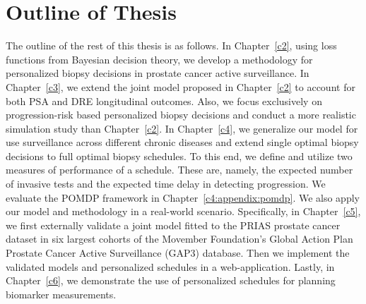 \section{Outline of Thesis}
\label{c1:sec:thesis_outline}
The outline of the rest of this thesis is as follows. In Chapter~\ref{c2}, using loss functions from Bayesian decision theory, we develop a methodology for personalized biopsy decisions in prostate cancer active surveillance. In Chapter~\ref{c3}, we extend the joint model proposed in Chapter~\ref{c2} to account for both PSA and DRE longitudinal outcomes. Also, we focus exclusively on progression-risk based personalized biopsy decisions and conduct a more realistic simulation study than Chapter~\ref{c2}. In Chapter~\ref{c4}, we generalize our model for use surveillance across different chronic diseases and extend single optimal biopsy decisions to full optimal biopsy schedules. To this end, we define and utilize two measures of performance of a schedule. These are, namely, the expected number of invasive tests and the expected time delay in detecting progression. We evaluate the POMDP framework in Chapter~\ref{c4:appendix:pomdp}. We also apply our model and methodology in a real-world scenario. Specifically, in Chapter~\ref{c5}, we first externally validate a joint model fitted to the PRIAS prostate cancer dataset in six largest cohorts of the Movember Foundation's Global Action Plan Prostate Cancer Active Surveillance (GAP3) database. Then we implement the validated models and personalized schedules in a web-application. Lastly, in Chapter~\ref{c6}, we demonstrate the use of personalized schedules for planning biomarker measurements.